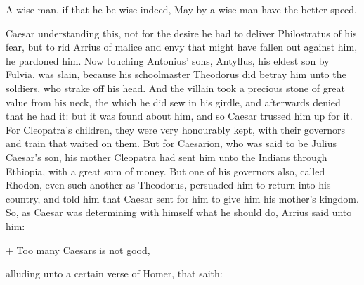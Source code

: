 \documentclass{book}
\begin{document}
\begin{versus}
\Locus \textus {+ 2em}
A wise man, if that he be wise indeed,
May by a wise man have the better speed.
\end{versus}

\noindent  Caesar understanding this, not for the desire he had to deliver Philostratus
of his fear, but to rid Arrius of malice and envy that might have fallen out
against him, he pardoned him. 
Now touching Antonius' sons, Antyllus, 
his eldest son by Fulvia, was
slain, because his schoolmaster The\-o\-do\-rus did betray him unto the soldiers,
who strake off his head. And the villain took a precious stone of great
value from his neck, the which he did sew in his girdle, and afterwards denied
that he had it: but it was found about him, and so Caesar trussed him up
for it. For Cleopatra's children, they were very honourably kept, with
their governors and train that waited on them. But for Caesarion, who was said
to be Julius Caesar's son, his mother Cleopatra had sent him unto the Indians
through Ethiopia, with a great sum of money. But one of his governors also,
called Rhodon, even such another as Theodorus, persuaded him to return into
his country, and told him that Caesar sent for him to give him his mother's
kingdom. 
So,  as Caesar was
determining with himself what he should do, Arrius said unto him:

\begin{versus}
\Locus \textus +
Too many Caesars is not good,
\end{versus}

\noindent alluding unto a certain verse of Homer, that saith: 
\end{document}
